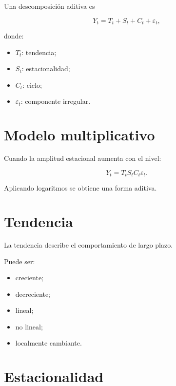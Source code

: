 \documentclass[
  spanish,
  10.5pt,
  letterpaper,
  DIV=11,
  numbers=noendperiod,
  oneside,
  open=any]{scrreprt}
\providecommand{\tightlist}{%
  \setlength{\itemsep}{0pt}\setlength{\parskip}{0pt}}
\theoremstyle{definition}
\theoremstyle{definition}
\theoremstyle{plain}
\theoremstyle{remark}
\begin{document}

Una descomposición aditiva es

\[
Y_t=T_t+S_t+C_t+\varepsilon_t,
\]

donde:

\begin{itemize}
\tightlist
\item
  \(T_t\): tendencia;
\item
  \(S_t\): estacionalidad;
\item
  \(C_t\): ciclo;
\item
  \(\varepsilon_t\): componente irregular.
\end{itemize}

\section*{Modelo multiplicativo}\label{modelo-multiplicativo}


Cuando la amplitud estacional aumenta con el nivel:

\[
Y_t=T_tS_tC_t\varepsilon_t.
\]

Aplicando logaritmos se obtiene una forma aditiva.

\section*{Tendencia}\label{tendencia}


La tendencia describe el comportamiento de largo plazo.

Puede ser:

\begin{itemize}
\tightlist
\item
  creciente;
\item
  decreciente;
\item
  lineal;
\item
  no lineal;
\item
  localmente cambiante.
\end{itemize}

\section*{Estacionalidad}\label{estacionalidad}
\end{document}
